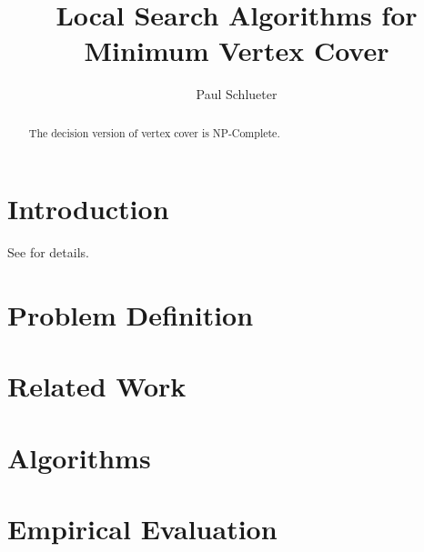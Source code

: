 \documentclass[sigconf]{acmart}
\begin{document}
\title{Local Search Algorithms for Minimum Vertex Cover}

\author{Paul Schlueter}

\begin{abstract}
The decision version of vertex cover is NP-Complete.
\end{abstract}


\maketitle
 
\section{Introduction} \label{sec:intro}
See \cite{cai2013numvc} for details.

\section{Problem Definition}

\section{Related Work}

\section{Algorithms}

\section{Empirical Evaluation}
\end{document}
